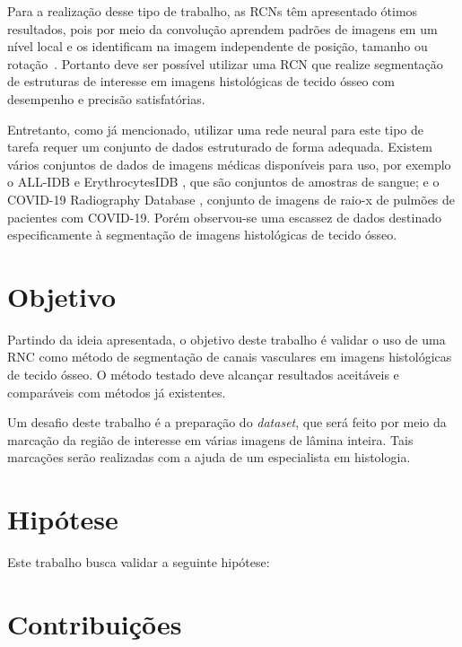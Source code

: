     Para a realização desse tipo de trabalho, as \acs{RCN}s têm apresentado ótimos resultados, pois por meio da convolução aprendem padrões de imagens em um nível local e os identificam na imagem independente de posição, tamanho ou rotação~\cite{mueller2019deep}. Portanto deve ser possível utilizar uma \acs{RCN} que realize segmentação de estruturas de interesse em imagens histológicas de tecido ósseo com desempenho e precisão satisfatórias.
    
    Entretanto, como já mencionado, utilizar uma rede neural para este tipo de tarefa requer um conjunto de dados estruturado de forma adequada.
    Existem vários conjuntos de dados de imagens médicas disponíveis para uso, por exemplo o ALL-IDB \cite{Labati2011} e ErythrocytesIDB \cite{Gonzalez-Hidalgo2015}, que são conjuntos de amostras de sangue; e o COVID-19 Radiography Database \cite{Chowdhury2020}, conjunto de imagens de raio-x de pulmões de pacientes com COVID-19. Porém observou-se uma escassez de dados destinado especificamente à segmentação de imagens histológicas de tecido ósseo.
    
\section{Objetivo}

    Partindo da ideia apresentada, o objetivo deste trabalho é validar o uso de uma \ac{RNC} como método de segmentação de canais vasculares em imagens histológicas de tecido ósseo. O método testado deve alcançar resultados aceitáveis e comparáveis com métodos já existentes.
    
    Um desafio deste trabalho é a preparação do \textit{dataset}, que será feito por meio da marcação da região de interesse em várias imagens de lâmina inteira. Tais marcações serão realizadas com a ajuda de um especialista em histologia.

\section{Hipótese}
Este trabalho busca validar a seguinte hipótese: \bigskip

\setlength{\fboxsep}{12pt}
\bigskip

\section{Contribuições}

